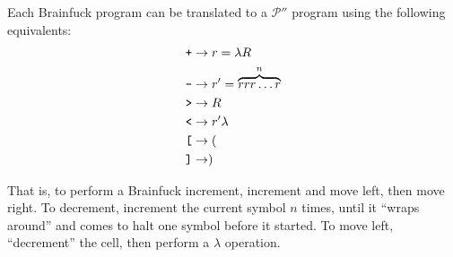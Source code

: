 Each Brainfuck program can be translated  to a $\mathcal{P}''$ program using the following equivalents:
\begin{align*}
    \text{\texttt{+}} &\rightarrow r = \lambda R\\
    \text{\texttt{-}} &\rightarrow r' = \overbrace{rrr\dots r}^n\\
    \text{\texttt{>}} &\rightarrow R\\
    \text{\texttt{<}} &\rightarrow r'\lambda\\
    \text{\texttt{[}} &\rightarrow (\\
    \text{\texttt{]}} &\rightarrow )
\end{align*}

That is, to perform a Brainfuck increment, increment and move left, then move right. To decrement, increment the current symbol $n$ times, until it “wraps around” and comes to halt one symbol before it started. To move left, “decrement” the cell, then perform a $\lambda$ operation.

%
%
%
%
